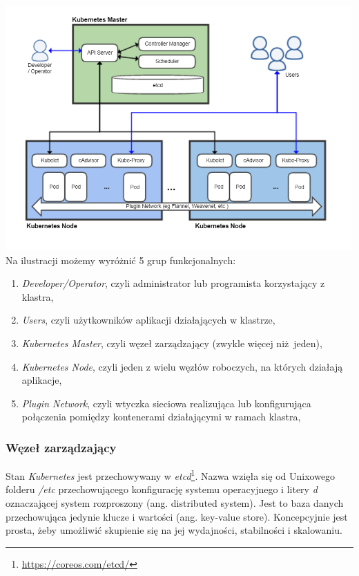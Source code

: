 \documentclass[a4paper,12pt,twoside,openany]{report}
\providecommand{\tightlist}{%
  \setlength{\itemsep}{0pt}\setlength{\parskip}{0pt}}
\DeclareRobustCommand{\href}[2]{#2\footnote{\url{#1}}}
\begin{document}
\includegraphics[width=5.20833in,height=3.6875in]{assets/kubernetes-architecture.png}\\

Na ilustracji możemy wyróżnić 5 grup funkcjonalnych:

\begin{enumerate}
\def\labelenumi{\arabic{enumi}.}
\tightlist
\item
  \emph{Developer/Operator}, czyli administrator lub programista
  korzystający z klastra,
\item
  \emph{Users}, czyli użytkowników aplikacji działających w klastrze,
\item
  \emph{Kubernetes Master}, czyli węzeł zarządzający (zwykle więcej
  niż~jeden),
\item
  \emph{Kubernetes Node}, czyli jeden z wielu węzłów roboczych, na
  których działają aplikacje,
\item
  \emph{Plugin Network}, czyli wtyczka sieciowa realizująca lub
  konfigurująca połączenia pomiędzy kontenerami działającymi w ramach
  klastra,
\end{enumerate}

\hypertarget{wux119zeux142-zarzux105dzajux105cy}{%
\subsubsection{Węzeł
zarządzający}\label{wux119zeux142-zarzux105dzajux105cy}}

Stan \emph{Kubernetes} jest przechowywany w
\href{https://coreos.com/etcd/}{\emph{etcd}}. Nazwa wzięła się od
Unixowego folderu \emph{/etc} przechowującego konfigurację systemu
operacyjnego i litery \emph{d} oznaczającej system rozproszony (ang.
distributed system). Jest to baza danych przechowująca jedynie klucze i
wartości (ang. key-value store). Koncepcyjnie jest prosta, żeby
umożliwić skupienie się na jej wydajności, stabilności i skalowaniu.
\end{document}

